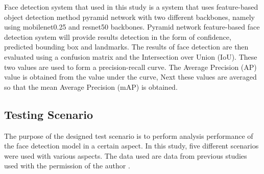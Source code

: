 Face detection system that
used in this study is a system that uses
feature-based object detection method pyramid network with two different backbones,
namely using mobilenet0.25 and resnet50 backbones.
Pyramid network feature-based face detection system will provide results
detection in the form of confidence, predicted bounding box and landmarks.
The results of face detection are then evaluated using a confusion matrix
and the Intersection over Union (IoU). These two values are used to form a precision-recall curve. The Average Precision (AP) value is obtained from the value under the curve, Next
these values are averaged so that the mean Average Precision (mAP) is obtained.

\subsection{Testing Scenario}
\label{subsec:skenariopengujian}

The purpose of the designed test scenario is to perform analysis
performance of the face detection model in a certain aspect.
In this study, five different scenarios were used
with various aspects. The data used are data from previous studies used with the permission of the author \citep{nugrohoevalution2016}.

